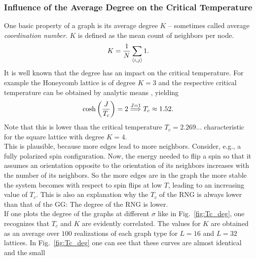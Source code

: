     \subsubsection{Influence of the Average Degree on the Critical Temperature}
        One basic property of a graph is its average degree \(K\) -- sometimes
        called average \emph{coordination number}. \(K\) is defined as the mean count
        of neighbors per node.
        \begin{equation}
            K = \frac{1}{N} \sum_{\left< i,j \right>} 1.
            \label{eq:degree}
        \end{equation}
        It is well known that the degree has an impact on the critical temperature.
        For example the Honeycomb lattice is of degree \(K=3\) and the
        respective critical temperature can be obtained by analytic means \cite{Wannier1945},
        yielding
        \begin{equation}
            \cosh\left(\frac{J}{T_c}\right)=2 \overset{J=1}{\Longrightarrow} T_c \approx 1.52.
            \label{eq:exactHCTc}
        \end{equation}
        Note that this is lower than the critical temperature \(T_c = 2.269...\)
        characteristic for the square lattice with degree \(K=4\).\\
        This is plausible, because more edges lead to more neighbors.
        Consider, e.g., a fully polarized spin configuration. Now, the
        energy needed to flip a spin so that it assumes an orientation opposite
        to the orientation of its neighbors increases with the number of
        its neighbors. So the more edges are in
        the graph the more stable the system becomes with respect to spin flips
        at low \(T\), leading to an increasing value of \(T_c\).
        This is also an explanation why the \(T_c\) of the RNG is always
        lower than that of the GG: The degree of the RNG is lower.\\
        If one plots the degree of the graphs at different \(\sigma\) like
        in Fig.\ \ref{fig:Tc_deg},
        one recognizes that \(T_c\) and \(K\) are evidently correlated.
        The values for \(K\) are obtained as an average over \(100\)
        realizations of each graph type for \(L=16\) and \(L=32\) lattices.
        In Fig.\ \ref{fig:Tc_deg}
        one can see that these curves are almost identical and the small
